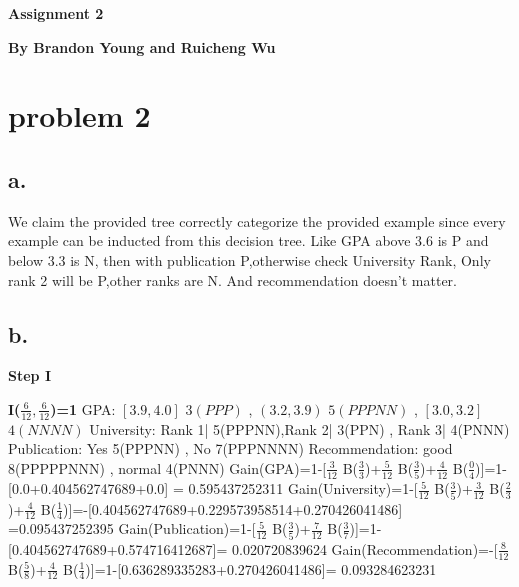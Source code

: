 \documentclass[12pt, letterpaper]{article}
\begin{document}
\textbf{\large Assignment 2}\newline
	
\textbf{By Brandon Young and Ruicheng Wu}

\section{problem 2}
\subsection{a.}

We claim the provided tree correctly categorize the provided example since every example can be inducted from this decision tree.
Like GPA above 3.6 is P and below 3.3 is N, then with publication P,otherwise check University Rank, Only rank 2 will be P,other ranks are N. And recommendation doesn't matter.

\subsection{b.}\large
\textbf{Step I}

\textbf{I($\frac{6}{12},\frac{6}{12}$)=1}\newline
GPA: $[3.9,4.0]$ $3(PPP)$ , $(3.2,3.9)$ $5(PPPNN)$ , $[3.0,3.2]$ $4(NNNN)$\newline
University: Rank 1| 5(PPPNN),Rank 2| 3(PPN) , Rank 3| 4(PNNN)\newline
Publication: Yes 5(PPPNN) , No 7(PPPNNNN)\newline
Recommendation: good 8(PPPPPNNN) , normal 4(PNNN)\newline\newline
Gain(GPA)=1-[$\frac{3}{12}$ B($\frac{3}{3}$)+$\frac{5}{12}$ B($\frac{3}{5}$)+$\frac{4}{12}$ B($\frac{0}{4}$)]=1-[0.0+0.404562747689+0.0]
= 0.595437252311\newline\newline
Gain(University)=1-[$\frac{5}{12}$ B($\frac{3}{5}$)+$\frac{3}{12}$ B($\frac{2}{3}$)+$\frac{4}{12}$ B($\frac{1}{4}$)]=-[0.404562747689+0.229573958514+0.270426041486] =0.095437252395\newline\newline
Gain(Publication)=1-[$\frac{5}{12}$ B($\frac{3}{5}$)+$\frac{7}{12}$ B($\frac{3}{7}$)]=1-[0.404562747689+0.574716412687]= 0.020720839624\newline\newline
Gain(Recommendation)=-[$\frac{8}{12}$ B($\frac{5}{8}$)+$\frac{4}{12}$ B($\frac{1}{4}$)]=1-[0.636289335283+0.270426041486]= 0.093284623231\newline
\end{document}
